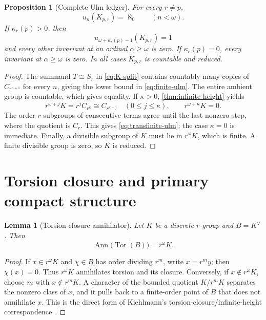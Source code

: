 \documentclass[11pt]{article}
\newtheorem{proposition}[theorem]{Proposition}
\newtheorem{lemma}[theorem]{Lemma}
\theoremstyle{definition}
\DeclareMathOperator{\Tor}{Tor}
\DeclareMathOperator{\Ann}{Ann}
\begin{document}
\begin{proposition}[Complete Ulm ledger]\label{prop:ulm-ledger}
For every $r\ne p$,
\begin{equation}\label{eq:finite-ulm}
u_n(K_{p,r})=\aleph_0\qquad(n<\omega).
\end{equation}
If $\kappa_r(p)>0$, then
\begin{equation}\label{eq:transfinite-ulm}
u_{\omega+\kappa_r(p)-1}(K_{p,r})=1
\end{equation}
and every other invariant at an ordinal $\alpha\ge\omega$ is zero.  If
$\kappa_r(p)=0$, every invariant at $\alpha\ge\omega$ is zero.  In all
cases $K_{p,r}$ is countable and reduced.
\end{proposition}

\begin{proof}
The summand $T\cong S_r$ in \eqref{eq:K-split} contains countably many copies
of $C_{r^{n+1}}$ for every $n$, giving the lower bound in
\eqref{eq:finite-ulm}.  The entire ambient group is countable, which gives
equality.  If $\kappa>0$, \cref{thm:infinite-height} yields
\[
r^{\omega+j}K=r^jC_{r^\kappa}\cong C_{r^{\kappa-j}}
\quad(0\le j\le\kappa),
\qquad
r^{\omega+\kappa}K=0.
\]
The order-$r$ subgroups of consecutive terms agree until the last nonzero
step, where the quotient is $C_r$.  This gives
\eqref{eq:transfinite-ulm}; the case $\kappa=0$ is immediate.  Finally, a
divisible subgroup of $K$ must lie in $r^\omega K$, which is finite.  A
finite divisible group is zero, so $K$ is reduced.
\end{proof}

\section{Torsion closure and primary compact structure}\label{sec:compact}

\begin{lemma}[Torsion-closure annihilator]\label{lem:torsion-annihilator}
Let $K$ be a discrete $r$-group and $B=K^\vee$.  Then
\begin{equation}\label{eq:torsion-annihilator}
\Ann\bigl(\overline{\Tor(B)}\bigr)=r^\omega K.
\end{equation}
\end{lemma}

\begin{proof}
If $x\in r^\omega K$ and $\chi\in B$ has order dividing $r^m$, write
$x=r^my$; then $\chi(x)=0$.  Thus $r^\omega K$ annihilates torsion and its
closure.  Conversely, if $x\notin r^\omega K$, choose $m$ with
$x\notin r^mK$.  A character of the bounded quotient $K/r^mK$ separates the
nonzero class of $x$, and it pulls back to a finite-order point of $B$ that
does not annihilate $x$.  This is the direct form of Kiehlmann's
torsion-closure/infinite-height correspondence
\citep[Theorem~1.1]{Kiehlmann2013}.
\end{proof}
\end{document}
